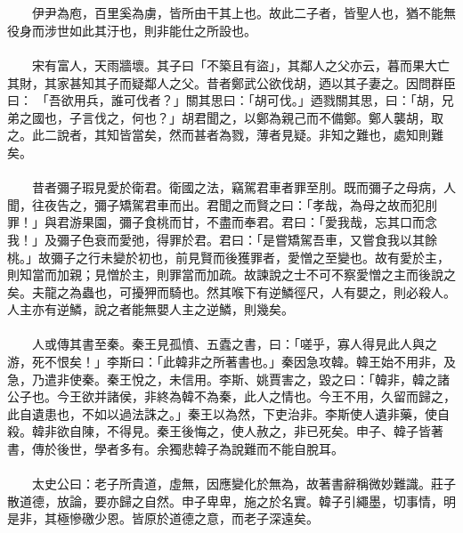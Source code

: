 \\\\
　　伊尹為庖，百里奚為虜，皆所由干其上也。故此二子者，皆聖人也，猶不能無役身而涉世如此其汙也，則非能仕之所設也。
\\\\
　　宋有富人，天雨牆壞。其子曰「不築且有盜」，其鄰人之父亦云，暮而果大亡其財，其家甚知其子而疑鄰人之父。昔者鄭武公欲伐胡，迺以其子妻之。因問群臣曰： 「吾欲用兵，誰可伐者？」關其思曰：「胡可伐。」迺戮關其思，曰：「胡，兄弟之國也，子言伐之，何也？」胡君聞之，以鄭為親己而不備鄭。鄭人襲胡，取之。此二說者，其知皆當矣，然而甚者為戮，薄者見疑。非知之難也，處知則難矣。
\\\\
　　昔者彌子瑕見愛於衛君。衛國之法，竊駕君車者罪至刖。既而彌子之母病，人聞，往夜告之，彌子矯駕君車而出。君聞之而賢之曰：「孝哉，為母之故而犯刖罪！」與君游果園，彌子食桃而甘，不盡而奉君。君曰：「愛我哉，忘其口而念我！」及彌子色衰而愛弛，得罪於君。君曰：「是嘗矯駕吾車，又嘗食我以其餘桃。」故彌子之行未變於初也，前見賢而後獲罪者，愛憎之至變也。故有愛於主，則知當而加親；見憎於主，則罪當而加疏。故諫說之士不可不察愛憎之主而後說之矣。夫龍之為蟲也，可擾狎而騎也。然其喉下有逆鱗徑尺，人有嬰之，則必殺人。人主亦有逆鱗，說之者能無嬰人主之逆鱗，則幾矣。
\\\\
　　人或傳其書至秦。秦王見孤憤、五蠹之書，曰：「嗟乎，寡人得見此人與之游，死不恨矣！」李斯曰：「此韓非之所著書也。」秦因急攻韓。韓王始不用非，及急，乃遣非使秦。秦王悅之，未信用。李斯、姚賈害之，毀之曰：「韓非，韓之諸公子也。今王欲并諸侯，非終為韓不為秦，此人之情也。今王不用，久留而歸之，此自遺患也，不如以過法誅之。」秦王以為然，下吏治非。李斯使人遺非藥，使自殺。韓非欲自陳，不得見。秦王後悔之，使人赦之，非已死矣。申子、韓子皆著書，傳於後世，學者多有。余獨悲韓子為說難而不能自脫耳。
\\\\
　　太史公曰：老子所貴道，虛無，因應變化於無為，故著書辭稱微妙難識。莊子散道德，放論，要亦歸之自然。申子卑卑，施之於名實。韓子引繩墨，切事情，明是非，其極慘礉少恩。皆原於道德之意，而老子深遠矣。

